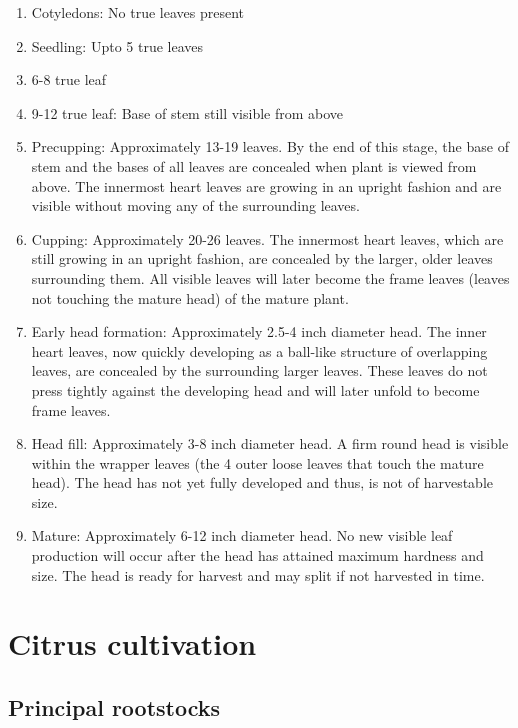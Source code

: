 \documentclass[
  openany]{book}
\providecommand{\tightlist}{%
  \setlength{\itemsep}{0pt}\setlength{\parskip}{0pt}}
\begin{document}
\begin{enumerate}
\def\labelenumi{\arabic{enumi}.}
\tightlist
\item
  Cotyledons: No true leaves present
\item
  Seedling: Upto 5 true leaves
\item
  6-8 true leaf
\item
  9-12 true leaf: Base of stem still visible from above
\item
  Precupping: Approximately 13-19 leaves. By the end of this stage, the base of stem and the bases of all leaves are concealed when plant is viewed from above. The innermost heart leaves are growing in an upright fashion and are visible without moving any of the surrounding leaves.
\item
  Cupping: Approximately 20-26 leaves. The innermost heart leaves, which are still growing in an upright fashion, are concealed by the larger, older leaves surrounding them. All visible leaves will later become the frame leaves (leaves not touching the mature head) of the mature plant.
\item
  Early head formation: Approximately 2.5-4 inch diameter head. The inner heart leaves, now quickly developing as a ball-like structure of overlapping leaves, are concealed by the surrounding larger leaves. These leaves do not press tightly against the developing head and will later unfold to become frame leaves.
\item
  Head fill: Approximately 3-8 inch diameter head. A firm round head is visible within the wrapper leaves (the 4 outer loose leaves that touch the mature head). The head has not yet fully developed and thus, is not of harvestable size.
\item
  Mature: Approximately 6-12 inch diameter head. No new visible leaf production will occur after the head has attained maximum hardness and size. The head is ready for harvest and may split if not harvested in time.
\end{enumerate}

\hypertarget{citrus-cultivation}{%
\section{Citrus cultivation}\label{citrus-cultivation}}

\hypertarget{principal-rootstocks}{%
\subsection{Principal rootstocks}\label{principal-rootstocks}}
\end{document}
